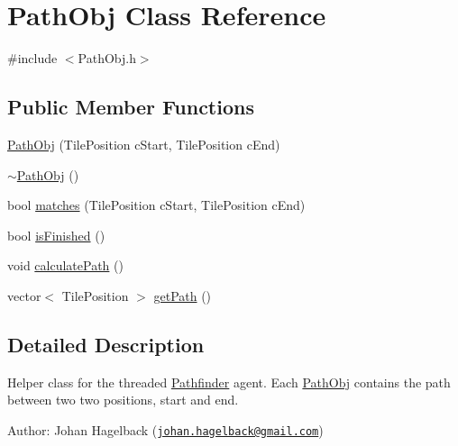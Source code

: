 \hypertarget{class_path_obj}{\section{Path\-Obj Class Reference}
\label{class_path_obj}
}


{\ttfamily \#include $<$Path\-Obj.\-h$>$}

\subsection*{Public Member Functions}
\begin{DoxyCompactItemize}
\item 
\hyperlink{class_path_obj_ae9f641a64cfc22a592186f0d55ec2021}{Path\-Obj} (Tile\-Position c\-Start, Tile\-Position c\-End)
\item 
\hyperlink{class_path_obj_aeea1e8f794c0416d4498fa0c706d5b39}{$\sim$\-Path\-Obj} ()
\item 
bool \hyperlink{class_path_obj_a63fe0a9810085e3571fef042dc38c2c3}{matches} (Tile\-Position c\-Start, Tile\-Position c\-End)
\item 
bool \hyperlink{class_path_obj_aaf44849ab49de76b50a9088e41fdabd9}{is\-Finished} ()
\item 
void \hyperlink{class_path_obj_ac2da681813e12a9b87e47ed6bdd0f60d}{calculate\-Path} ()
\item 
vector$<$ Tile\-Position $>$ \hyperlink{class_path_obj_af43d4958056969711265fc851932283c}{get\-Path} ()
\end{DoxyCompactItemize}


\subsection{Detailed Description}
Helper class for the threaded \hyperlink{class_pathfinder}{Pathfinder} agent. Each \hyperlink{class_path_obj}{Path\-Obj} contains the path between two two positions, start and end.

Author\-: Johan Hagelback (\href{mailto:johan.hagelback@gmail.com}{\tt johan.\-hagelback@gmail.\-com}) 

